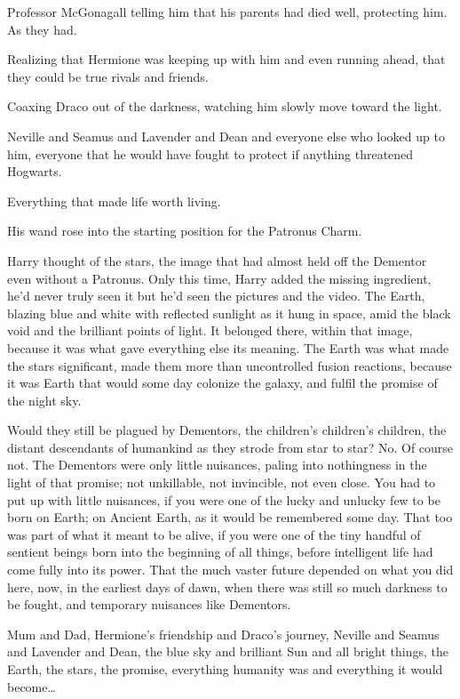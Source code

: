 Professor McGonagall telling him that his parents had died well, protecting him. As they had.

Realizing that Hermione was keeping up with him and even running ahead, that they could be true rivals and friends.

Coaxing Draco out of the darkness, watching him slowly move toward the light.

Neville and Seamus and Lavender and Dean and everyone else who looked up to him, everyone that he would have fought to protect if anything threatened Hogwarts.

Everything that made life worth living.

His wand rose into the starting position for the Patronus Charm.

Harry thought of the stars, the image that had almost held off the Dementor even without a Patronus. Only this time, Harry added the missing ingredient, he’d never truly seen it but he’d seen the pictures and the video. The Earth, blazing blue and white with reflected sunlight as it hung in space, amid the black void and the brilliant points of light. It belonged there, within that image, because it was what gave everything else its meaning. The Earth was what made the stars significant, made them more than uncontrolled fusion reactions, because it was Earth that would some day colonize the galaxy, and fulfil the promise of the night sky.

Would they still be plagued by Dementors, the children’s children’s children, the distant descendants of humankind as they strode from star to star? No. Of course not. The Dementors were only little nuisances, paling into nothingness in the light of that promise; not unkillable, not invincible, not even close. You had to put up with little nuisances, if you were one of the lucky and unlucky few to be born on Earth; on Ancient Earth, as it would be remembered some day. That too was part of what it meant to be alive, if you were one of the tiny handful of sentient beings born into the beginning of all things, before intelligent life had come fully into its power. That the much vaster future depended on what you did here, now, in the earliest days of dawn, when there was still so much darkness to be fought, and temporary nuisances like Dementors.

Mum and Dad, Hermione’s friendship and Draco’s journey, Neville and Seamus and Lavender and Dean, the blue sky and brilliant Sun and all bright things, the Earth, the stars, the promise, everything humanity was and everything it would become…

